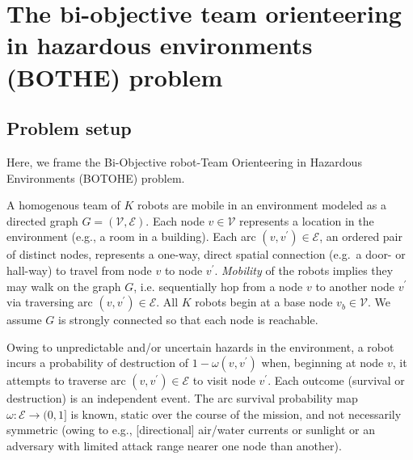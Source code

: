 \documentclass[fleqn,10pt,lineno]{wlpeerj}
\begin{document}
\section{The bi-objective team orienteering in hazardous environments (BOTHE) problem}



\subsection{Problem setup}
Here, we frame the Bi-Objective robot-Team Orienteering in Hazardous Environments (BOTOHE) problem. 

A homogenous team of $K$ robots are mobile in an environment modeled as a directed graph $G=(\mathcal{V}, \mathcal{E})$. Each node $v \in \mathcal{V}$ represents a location in the environment (e.g., a room in a building). Each arc $(v, v^\prime) \in\mathcal{E}$, an ordered pair of distinct nodes, represents a one-way, direct spatial connection (e.g.\ a door- or hall-way) to travel from node $v$ to node $v^\prime$. 
\emph{Mobility} of the robots implies they may walk on the graph $G$, i.e. sequentially hop from a node $v$ to another node $v^\prime$ via traversing arc $(v, v^\prime)\in\mathcal{E}$.
All $K$ robots begin at a base node $v_b \in \mathcal{V}$. 
We assume $G$ is strongly connected so that each node is reachable.

Owing to unpredictable and/or uncertain hazards in the environment, a robot incurs a probability of destruction of $1 - \omega(v, v^\prime)$ when, beginning at node $v$, it attempts to traverse arc $(v, v^\prime) \in \mathcal{E}$ to visit node $v^\prime$.
Each outcome (survival or destruction) is an independent event. 
The arc survival probability map $\omega: \mathcal{E} \rightarrow (0, 1]$ is known, static over the course of the mission, and not necessarily symmetric (owing to e.g., [directional] air/water currents or sunlight or an adversary with limited attack range nearer one node than another).
\end{document}
